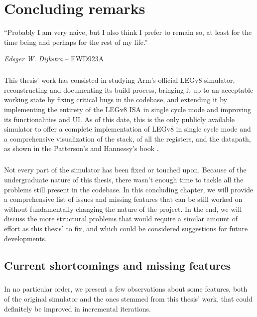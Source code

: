 \chapter{Concluding remarks}
\label{chap:concl}

\epigraph{``Probably I am very naive, but I also think I prefer to remain so, at least for the time being and perhaps for the rest of my life.''}{\textit{Edsger W. Dijkstra} -- EWD923A}

\paragraph{}
This thesis' work has consisted in studying Arm's official LEGv8 simulator, reconstructing and documenting its build process, bringing it up to an acceptable working state by fixing critical bugs in the codebase, and extending it by implementing the entirety of the LEGv8 ISA in single cycle mode and improving its functionalities and UI. As of this date, this is the only publicly available simulator to offer a complete implementation of LEGv8 in single cycle mode and a comprehensive visualization of the stack, of all the registers, and the datapath, as shown in the Patterson's and Hannessy's book \cite{patterson2016computer}.
\paragraph{}
Not every part of the simulator has been fixed or touched upon. Because of the undergraduate nature of this thesis, there wasn't enough time to tackle all the problems still present in the codebase. In this concluding chapter, we will provide a comprehensive list of issues and missing features that can be still worked on without fundamentally changing the nature of the project. In the end, we will discuss the more structural problems that would require a similar amount of effort as this thesis' to fix, and which could be considered suggestions for future developments.

\section{Current shortcomings and missing features}
\paragraph{}
In no particular order, we present a few observations about some features, both of the original simulator and the ones stemmed from this thesis' work, that could definitely be improved in incremental iterations.
